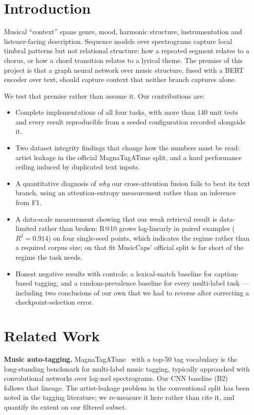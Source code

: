 \documentclass[conference]{IEEEtran}
\begin{document}
\section{Introduction}
Musical ``context'' spans genre, mood, harmonic structure, instrumentation and
listener-facing description. Sequence models over spectrograms capture local
timbral patterns but not relational structure: how a repeated segment relates
to a chorus, or how a chord transition relates to a lyrical theme. The premise
of this project is that a graph neural network over music structure, fused with
a BERT encoder over text, should capture context that neither branch captures
alone.

We test that premise rather than assume it. Our contributions are:

\begin{itemize}\itemsep2pt
\item Complete implementations of all four tasks, with more than $140$ unit
tests and every result reproducible from a seeded configuration recorded
alongside it.
\item Two dataset integrity findings that change how the numbers must be read:
artist leakage in the official MagnaTagATune split, and a hard performance
ceiling induced by duplicated text inputs.
\item A quantitative diagnosis of \emph{why} our cross-attention fusion fails
to beat its text branch, using an attention-entropy measurement rather than an
inference from F1.
\item A data-scale measurement showing that our weak retrieval result is
data-limited rather than broken: R@10 grows log-linearly in paired examples
($R^2 = 0.914$) on four single-seed points, which indicates the regime rather
than a required corpus size; on that fit MusicCaps' official split is far short
of the regime the task needs.
\item Honest negative results with controls: a lexical-match baseline for
caption-based tagging, and a random-prevalence baseline for every multi-label
task --- including two conclusions of our own that we had to reverse after
correcting a checkpoint-selection error.
\end{itemize}

\section{Related Work}
\textbf{Music auto-tagging.} MagnaTagATune~\cite{mtat} with a top-50 tag vocabulary is the
long-standing benchmark for multi-label music tagging, typically approached
with convolutional networks over log-mel spectrograms. Our CNN baseline (B2)
follows that lineage. The artist-leakage problem in the conventional split has
been noted in the tagging literature; we re-measure it here rather than cite it,
and quantify its extent on our filtered subset.
\end{document}
